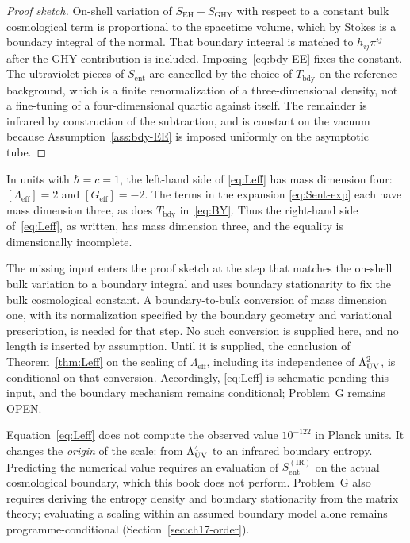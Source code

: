 \begin{proof}[Proof sketch]
  On-shell variation of \(S_{\mathrm{EH}}+S_{\mathrm{GHY}}\) with
  respect to a constant bulk cosmological term is proportional to
  the spacetime volume, which by Stokes is a boundary integral of
  the normal. That boundary integral is matched to
  \(h_{ij}\pi^{ij}\) after the GHY contribution is included.
  Imposing~\eqref{eq:bdy-EE} fixes the constant. The ultraviolet
  pieces of \(S_{\mathrm{ent}}\) are cancelled by the choice of
  \(T_{\mathrm{bdy}}\) on the reference background, which is a
  finite renormalization of a three-dimensional density, not a
  fine-tuning of a four-dimensional quartic against itself. The
  remainder is infrared by construction of the subtraction, and
  is constant on the vacuum because Assumption~\ref{ass:bdy-EE}
  is imposed uniformly on the asymptotic tube.
\end{proof}

\begin{remark}
In units with \(\hbar=c=1\), the left-hand side of
\eqref{eq:Leff} has mass dimension four:
\([\Lambda_{\mathrm{eff}}]=2\) and
\([G_{\mathrm{eff}}]=-2\). The terms in the expansion
\eqref{eq:Sent-exp} each have mass dimension three, as does
\(T_{\mathrm{bdy}}\) in~\eqref{eq:BY}. Thus the right-hand side
of~\eqref{eq:Leff}, as written, has mass dimension three, and the
equality is dimensionally incomplete.

The missing input enters the proof sketch at the step that matches
the on-shell bulk variation to a boundary integral and uses boundary
stationarity to fix the bulk cosmological constant. A
boundary-to-bulk conversion of mass dimension one, with its
normalization specified by the boundary geometry and variational
prescription, is needed for that step. No such conversion is supplied
here, and no length is inserted by assumption. Until it is supplied,
the conclusion of Theorem~\ref{thm:Leff} on the scaling of
\(\Lambda_{\mathrm{eff}}\), including its independence of
\(\Lambda_{\mathrm{UV}}^2\), is conditional on that conversion. Accordingly,
\eqref{eq:Leff} is schematic pending this input, and the boundary
mechanism remains conditional; Problem~G remains OPEN.
\end{remark}
\begin{remark}
  Equation~\eqref{eq:Leff} does not compute the observed value
  \(10^{-122}\) in Planck units. It changes the \emph{origin} of
  the scale: from \(\Lambda_{\mathrm{UV}}^4\) to an infrared boundary entropy.
  Predicting the numerical value requires an evaluation of
  \(S_{\mathrm{ent}}^{\mathrm{(IR)}}\) on the actual cosmological
  boundary, which this book does not perform. Problem~G also
  requires deriving the entropy density and boundary stationarity
  from the matrix theory; evaluating a scaling within an assumed
  boundary model alone remains programme-conditional
  (Section~\ref{sec:ch17-order}).
\end{remark}

